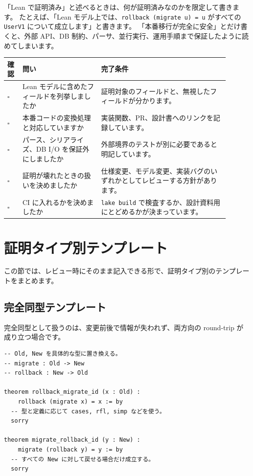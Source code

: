 「Lean で証明済み」と述べるときは、何が証明済みなのかを限定して書きます。
たとえば、「Lean モデル上では、\texttt{rollback (migrate u) = u} がすべての \texttt{UserV1} について成立します」と書きます。
「本番移行が完全に安全」とだけ書くと、外部 API、DB 制約、パーサ、並行実行、運用手順まで保証したように読めてしまいます。

\begin{longtable}{@{}p{0.06\linewidth}p{0.32\linewidth}p{0.52\linewidth}@{}}
\toprule
確認 & 問い & 完了条件 \\
\midrule
\endhead
\(\square\) & Lean モデルに含めたフィールドを列挙しましたか & 証明対象のフィールドと、無視したフィールドが分かります。 \\
\(\square\) & 本番コードの変換処理と対応していますか & 実装関数、PR、設計書へのリンクを記録しています。 \\
\(\square\) & パース、シリアライズ、DB I/O を保証外にしましたか & 外部境界のテストが別に必要であると明記しています。 \\
\(\square\) & 証明が壊れたときの扱いを決めましたか & 仕様変更、モデル変更、実装バグのいずれかとしてレビューする方針があります。 \\
\(\square\) & CI に入れるかを決めましたか & \texttt{lake build} で検査するか、設計資料用にとどめるかが決まっています。 \\
\bottomrule
\end{longtable}

\section{証明タイプ別テンプレート}

この節では、レビュー時にそのまま記入できる形で、証明タイプ別のテンプレートをまとめます。

\subsection{完全同型テンプレート}

完全同型として扱うのは、変更前後で情報が失われず、両方向の round-trip が成り立つ場合です。

\begin{listing}[htbp]
\begin{verbatim}
-- Old, New を具体的な型に置き換える。
-- migrate : Old -> New
-- rollback : New -> Old

theorem rollback_migrate_id (x : Old) :
    rollback (migrate x) = x := by
  -- 型と定義に応じて cases, rfl, simp などを使う。
  sorry

theorem migrate_rollback_id (y : New) :
    migrate (rollback y) = y := by
  -- すべての New に対して戻せる場合だけ成立する。
  sorry
\end{verbatim}
\caption{\texttt{rollback\_migrate\_id}・\texttt{migrate\_rollback\_id}}
\label{lst:appD_template_iso}
\end{listing}

